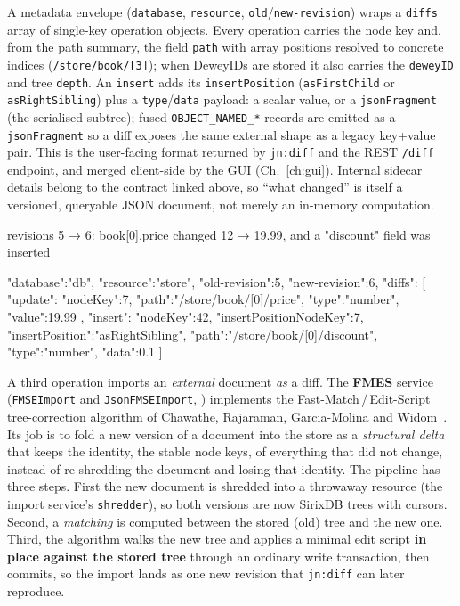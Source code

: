 \documentclass[11pt,a4paper,oneside]{report}
\newcommand{\dcap}[1]{\par\vspace{1pt}\noindent{\small\sffamily\bfseries\color{slate}#1}\par\vspace{-2pt}}
\theoremstyle{sirixthm}
\newcommand{\code}[1]{\texttt{#1}}
\begin{document}
A metadata envelope (\code{database}, \code{resource}, \code{old}/\allowbreak\code{new-revision}) wraps a
\code{diffs} array of single-key operation objects. Every operation carries the node key and, from the
path summary, the field \code{path} with array positions resolved to concrete indices
(\code{/store/book/[3]}); when DeweyIDs are stored it also carries the \code{deweyID} and tree
\code{depth}. An \code{insert} adds its \code{insertPosition} (\code{asFirstChild} or
\code{asRightSibling}) plus a \code{type}/\allowbreak\code{data} payload: a scalar value, or a
\code{jsonFragment} (the serialised subtree); fused \code{OBJECT\_NAMED\_*} records are emitted as a
\code{jsonFragment} so a diff exposes the same external shape as a legacy key{+}value pair. This is the
user-facing format returned by \code{jn:diff} and the REST \code{/diff} endpoint, and merged
client-side by the GUI (Ch.~\ref{ch:gui}). Internal sidecar details belong to the contract linked
above, so ``what changed'' is itself a versioned, queryable JSON document, not merely an
in-memory computation.

\dcap{A concrete edit script: \texttt{jn:diff('db','store', 5, 6)}}
\begin{diagramS}
revisions 5 → 6: book[0].price changed 12 → 19.99, and a "discount" field was inserted

{ "database":"db", "resource":"store", "old-revision":5, "new-revision":6,
  "diffs": [
    { "update": { "nodeKey":7,  "path":"/store/book/[0]/price",
                  "type":"number", "value":19.99 } },
    { "insert": { "nodeKey":42, "insertPositionNodeKey":7, "insertPosition":"asRightSibling",
                  "path":"/store/book/[0]/discount", "type":"number", "data":0.1 } } ] }
\end{diagramS}

A third operation imports an \emph{external} document \emph{as} a diff. The \textbf{FMES} service
(\code{FMSEImport} and \code{JsonFMSEImport}, ) implements the Fast-Match\,/\,Edit-Script
tree-correction algorithm of Chawathe, Rajaraman, Garcia-Molina and Widom~\cite{chawathe}. Its job is to fold a
new version of a document into the store as a \emph{structural delta} that keeps the identity, the
stable node keys, of everything that did not change, instead of re-shredding the document and losing
that identity. The pipeline has three steps. First the new document is shredded into a throwaway
resource (the import service's \code{shredder}), so both versions are now SirixDB trees with cursors. Second, a
\emph{matching} is computed between the stored (old) tree and the new one. Third, the algorithm walks
the new tree and applies a minimal edit script \textbf{in place against the stored tree} through an
ordinary write transaction, then commits, so the import lands as one new revision that \code{jn:diff}
can later reproduce.
\end{document}

